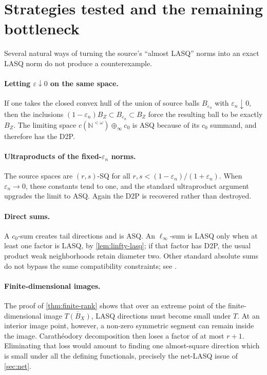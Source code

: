 \documentclass[11pt]{article}
\newcommand{\N}{\mathbb N}
\newcommand{\eps}{\varepsilon}
\begin{document}
\section{Strategies tested and the remaining bottleneck}
\label{sec:strategies}

Several natural ways of turning the source's ``almost LASQ'' norms into an exact LASQ norm do not produce a counterexample.

\paragraph{Letting $\eps\downarrow0$ on the same space.}
If one takes the closed convex hull of the union of source balls $B_{\eps_n}$ with $\eps_n\downarrow0$, then the inclusions $(1-\eps_n)B_Z\subset B_{\eps_n}\subset B_Z$ force the resulting ball to be exactly $B_Z$.  The limiting space $c(\N^{<\omega})\oplus_\infty c_0$ is ASQ because of its $c_0$ summand, and therefore has the D2P.

\paragraph{Ultraproducts of the fixed-$\eps_n$ norms.}
The source spaces are $(r,s)$-SQ for all $r,s<(1-\eps_n)/(1+\eps_n)$.  When $\eps_n\to0$, these constants tend to one, and the standard ultraproduct argument upgrades the limit to ASQ.  Again the D2P is recovered rather than destroyed.

\paragraph{Direct sums.}
A $c_0$-sum creates tail directions and is ASQ.  An $\ell_\infty$-sum is LASQ only when at least one factor is LASQ, by \cref{lem:linfty-lasq}; if that factor has D2P, the usual product weak neighborhoods retain diameter two.  Other standard absolute sums do not bypass the same compatibility constraints; see \cite{Hardtke2018}.

\paragraph{Finite-dimensional images.}
The proof of \cref{thm:finite-rank} shows that over an extreme point of the finite-dimensional image $\overline{T(B_X)}$, LASQ directions must become small under $T$.  At an interior image point, however, a non-zero symmetric segment can remain inside the image.  Carath\'eodory decomposition then loses a factor of at most $r+1$.  Eliminating that loss would amount to finding one almost-square direction which is small under all the defining functionals, precisely the net-LASQ issue of \cref{sec:net}.
\end{document}
